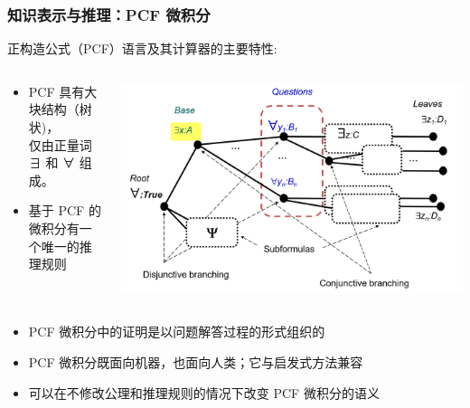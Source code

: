 \documentclass[10pt]{beamer}
\begin{document}
\begin{frame}
  \frametitle{知识表示与推理：PCF 微积分}
  正构造公式（PCF）语言及其计算器的主要特性:
  \begin{columns}
    \begin{column}{0.5\linewidth}
      \begin{itemize}
      \item  PCF 具有大块结构（树状)，\\ 仅由正量词∃ 和 ∀ 组成。
      \item 基于 PCF 的微积分有一个唯一的推理规则
      \end{itemize}
    \end{column}
    \begin{column}{0.5\linewidth}
      \includegraphics[width=\linewidth]{pcf-block-struct.png}
    \end{column}
  \end{columns}
\begin{itemize}
\item PCF 微积分中的证明是以问题解答过程的形式组织的
\item PCF 微积分既面向机器，也面向人类；它与启发式方法兼容
\item 可以在不修改公理和推理规则的情况下改变 PCF 微积分的语义
\end{itemize}
\end{frame}
\end{document}
